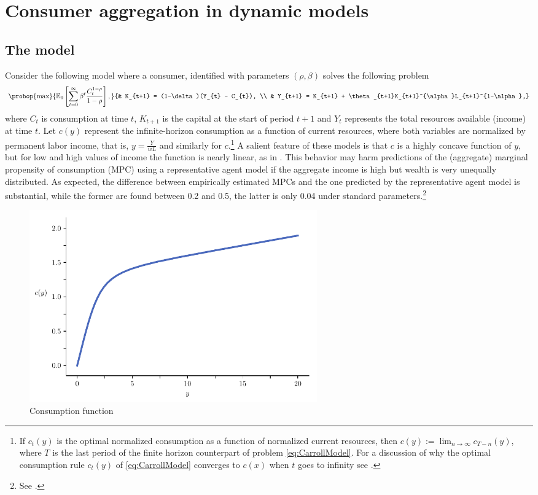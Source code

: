 \documentclass[english, a4paper,12pt]{article}
\begin{document}
\section{Consumer aggregation in dynamic models} \label{sec:CarrollAgg}

\subsection{The model}
Consider the following model where a consumer, identified with parameters $(\rho, \beta)$ solves the following problem
	\begin{equation} \label{eq:CarrollModel}
		\probop{\max}{\mathbb{E}_{0}\left[\sum_{t=0}^{\infty} \beta^{t} \frac{C_{t}^{1-\rho}}{1-\rho} \right],}
				{&	K_{t+1} = (1-\delta)(Y_{t} - C_{t}),	\\
				&	Y_{t+1} = K_{t+1} + \theta_{t+1}K_{t+1}^{\alpha}L_{t+1}^{1-\alpha},}
	\end{equation}
where $C_{t}$ is consumption at time $t$, $K_{t+1}$ is the capital at the start of period $t+1$ and $Y_{t}$ represents the total resources available (income) at time $t$. Let $c(y)$ represent the infinite-horizon consumption as a function of current resources, where both variables are normalized by permanent labor income, that is, $y = \frac{Y}{wL}$ and similarly for $c$.\footnote{If $c_{t}(y)$ is the optimal normalized consumption as a function of normalized current resources, then $c(y) := \lim_{n \to \infty} c_{T-n}(y)$, where $T$ is the last period of the finite horizon counterpart of problem \eqref{eq:CarrollModel}. For a discussion of why the optimal consumption rule $c_{t}(y)$ of \eqref{eq:CarrollModel} converges to $c(x)$ when $t$ goes to infinity see .} A salient feature of these models is that $c$ is a highly concave function of $y$, but for low and high values of income the function is nearly linear, as in . This behavior may harm predictions of the (aggregate) marginal propensity of consumption (MPC) using a representative agent model if the aggregate income is high but wealth is very unequally distributed. As expected, the difference between empirically estimated MPCs and the one predicted by the representative agent model is substantial, while the former are found between 0.2 and 0.5, the latter is only 0.04 under standard parameters.\footnote{See \cite{CarrollRequiem}.}
	\begin{figure}
		\caption{Consumption function}
		\label{fig:concaveC}
		\includegraphics[width=0.6\textwidth]{CarrollCons}
	\end{figure}
	
\end{document}
